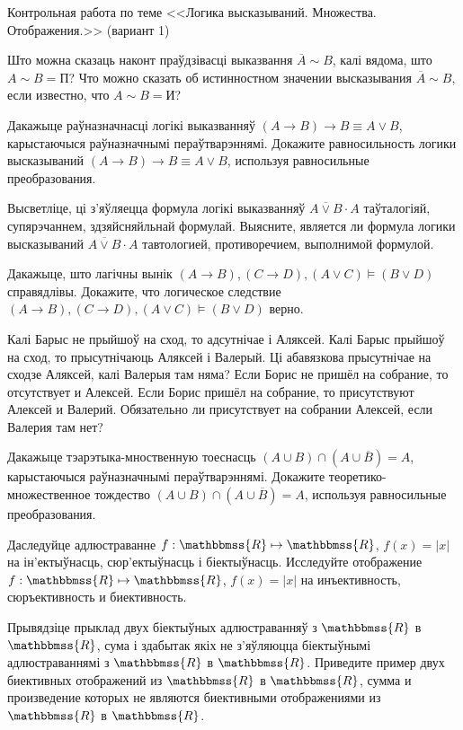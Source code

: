


	
\begin{center}
{Контрольная работа по теме <<Логика высказываний. Множества. Отображения.>> (вариант 1)}	
\end{center}

\begin{problemList}

\problemItemSimple
{Што можна сказаць наконт праўдзівасці выказвання $\overline{A} \sim B$, калі вядома, што $A \sim B = \mbox{П}$?}
{Что можно сказать об истинностном значении высказывания $\overline{A} \sim B$, если известно, что $A \sim B = \mbox{И}$?}

\problemItemSimple
{Дакажыце раўназначнасці логікі выказванняў $(A \to B) \to B \equiv A \vee B$, карыстаючыся раўназначнымі пераўтварэннямі.}
{Докажите равносильность логики высказываний $(A \to B) \to B \equiv A \vee B$, используя равносильные преобразования.}

\problemItemSimple
{Высветліце, ці з'яўляецца формула логікі выказванняў $\overline{A \vee B} \cdot A$ таўталогіяй, супярэчаннем, здзяйсняйльнай формулай.}
{Выясните, является ли формула логики высказываний $\overline{A \vee B} \cdot A$ тавтологией, противоречием, выполнимой формулой.}

\problemItemSimple
{Дакажыце, што лагічны вынік $(A \to B), (C \to D), (A \vee C) \models (B \vee D)$ справядлівы.}
{Докажите, что логическое следствие $(A \to B), (C \to D), (A \vee C) \models (B \vee D)$ верно.}

\problemItemSimple
{Калі Барыс не прыйшоў на сход, то адсутнічае і Аляксей. Калі Барыс прыйшоў на сход, то прысутнічаюць Аляксей і Валерый. Ці абавязкова прысутнічае на сходзе Аляксей, калі Валерыя там няма?}
{Если Борис не пришёл на собрание, то отсутствует и Алексей. Если Борис пришёл на собрание, то присутствуют Алексей и Валерий. Обязательно ли присутствует на собрании Алексей, если Валерия там нет?}

\problemItemSimple
{Дакажыце тэарэтыка-мноственную тоеснасць $(A \cup B) \cap (A \cup \overline{B}) = A$, карыстаючыся раўназначнымі пераўтварэннямі.}
{Докажите теоретико-множественное тождество $(A \cup B) \cap (A \cup \overline{B}) = A$, используя равносильные преобразования.}

\problemItemSimple
{Даследуйце адлюстраванне $f: \mathbbmss{R} \mapsto \mathbbmss{R}$, $f(x) = |x|$ на ін'ектыўнасць, сюр'ектыўнасць і біектыўнасць. }
{Исследуйте отображение $f: \mathbbmss{R} \mapsto \mathbbmss{R}$, $f(x) = |x|$ на инъективность, сюръективность и биективность.}

\problemItemSimple
{Прывядзіце прыклад двух біектыўных адлюстраванняў з $\mathbbmss{R}$ в $\mathbbmss{R}$, сума і здабытак якіх не з'яўляюцца біектыўнымі адлюстраваннямі з $\mathbbmss{R}$ в $\mathbbmss{R}$.}
{Приведите пример двух биективных отображений из $\mathbbmss{R}$ в $\mathbbmss{R}$, сумма и произведение которых не являются биективными отображениями из $\mathbbmss{R}$ в $\mathbbmss{R}$.}

\end{problemList}	

